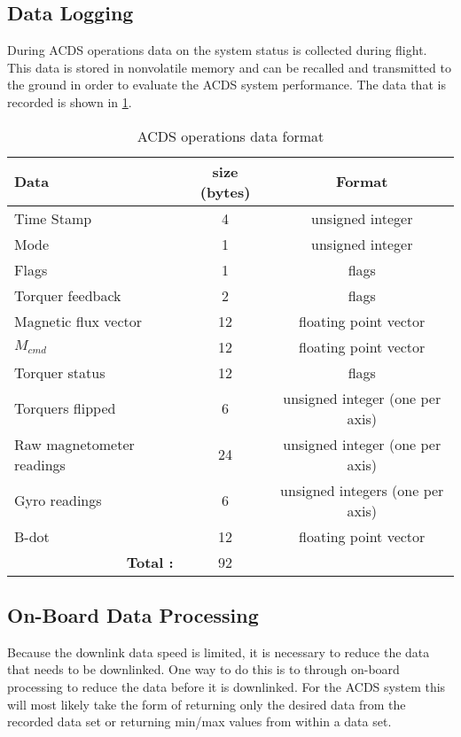 \subsection{Data Logging}

During \ac{ACDS} operations data on the system status is collected during flight. This data is stored in nonvolatile memory and can be recalled and transmitted to the ground in order to evaluate the \ac{ACDS} system performance. The data that is recorded is shown in \cref{tab:logdat}.

\begin{table}[H]
    \centering
    \caption{\ac{ACDS} operations data format}
    \label{tab:logdat}
    \begin{tabular}{|l|c|c|}
        \hline
        Data&size (bytes)&Format\\
        \hline
        Time Stamp&4&unsigned integer\\
        \hline
        Mode&1&unsigned integer\\
        \hline
        Flags&1&flags\\
        \hline
        Torquer feedback&2&flags\\
        \hline
        Magnetic flux vector&12&floating point vector\\
        \hline
        $M_{cmd}$&12&floating point vector\\
        \hline
        Torquer status&12&flags\\
        \hline
        Torquers flipped&6&unsigned integer (one per axis)\\
        \hline
        Raw magnetometer readings&24&unsigned integer (one per axis)\\
        \hline
        Gyro readings&6&unsigned integers (one per axis)\\
        \hline
        B-dot&12&floating point vector\\
        \hline
        \multicolumn{1}{|r|}{\bfseries Total :}&92&\\
        \hline
    \end{tabular}
\end{table}

\subsection{On-Board Data Processing}

Because the downlink data speed is limited, it is necessary to reduce the data that needs to be downlinked. One way to do this is to through on-board processing to reduce the data before it is downlinked. For the \ac{ACDS} system this will most likely take the form of returning only the desired data from the recorded data set or returning min/max values from within a data set. 

